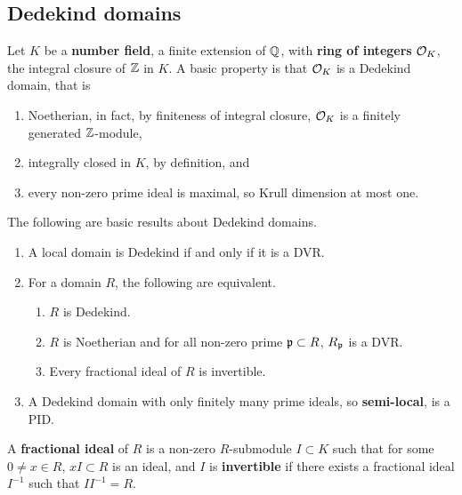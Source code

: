 \subsection{Dedekind domains}

Let $ K $ be a \textbf{number field}, a finite extension of $ \mathbb{Q} $, with \textbf{ring of integers} $ \mathcal{O}_K $, the integral closure of $ \mathbb{Z} $ in $ K $. A basic property is that $ \mathcal{O}_K $ is a Dedekind domain, that is
\begin{enumerate}
\item Noetherian, in fact, by finiteness of integral closure, $ \mathcal{O}_K $ is a finitely generated $ \mathbb{Z} $-module,
\item integrally closed in $ K $, by definition, and
\item every non-zero prime ideal is maximal, so Krull dimension at most one.
\end{enumerate}
The following are basic results about Dedekind domains.

\begin{theorem}
\label{thm:2.1}
\hfill
\begin{enumerate}
\item A local domain is Dedekind if and only if it is a DVR.
\item For a domain $ R $, the following are equivalent.
\begin{enumerate}
\item $ R $ is Dedekind.
\item $ R $ is Noetherian and for all non-zero prime $ \mathfrak{p} \subset R $, $ R_{\mathfrak{p}} $ is a DVR.
\item Every fractional ideal of $ R $ is invertible.
\end{enumerate}
\item A Dedekind domain with only finitely many prime ideals, so \textbf{semi-local}, is a PID.
\end{enumerate}
\end{theorem}

A \textbf{fractional ideal} of $ R $ is a non-zero $ R $-submodule $ I \subset K $ such that for some $ 0 \ne x \in R $, $ xI \subset R $ is an ideal, and $ I $ is \textbf{invertible} if there exists a fractional ideal $ I^{-1} $ such that $ II^{-1} = R $.

